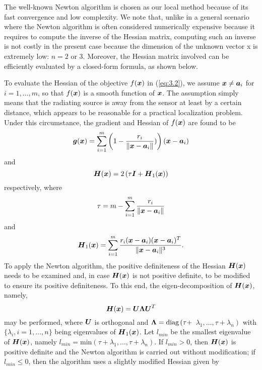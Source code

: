 The well-known Newton algorithm \cite{AntonLu} is chosen as our local method because of its fast convergence and low complexity. We note that, unlike in a general scenario where the Newton algorithm is often considered numerically expensive because it requires to compute the inverse of the Hessian matrix, computing such an inverse is not costly in the present case because the dimension of the unknown vector x is extremely low: $n = 2$ or 3. Moreover, the Hessian matrix involved can be efficiently evaluated by a closed-form formula, as shown below.

To evaluate the Hessian of the objective $f(\mbox{\boldmath$x$})$ in (\ref{eq:3.2}), we assume $\mbox{\boldmath$x$}\neq\mbox{\boldmath$a$}_i$  for $i = 1, \ldots, m$, so that $f(\mbox{\boldmath$x$})$  is a smooth function of $\mbox{\boldmath$x$}$. The assumption simply means that the radiating source is away from the sensor at least by a certain distance, which appears to be reasonable for a practical localization problem. Under this circumstance, the gradient and Hessian of $f(\mbox{\boldmath$x$})$ are found to be
\begin{equation}
\nonumber
\mbox{\boldmath$g$}(\mbox{\boldmath$x$})=\sum_{i=1}^m\left(1-\frac{r_i}{\|\mbox{\boldmath$x$}-\mbox{\boldmath$a$}_i\|})\right)\left(\mbox{\boldmath$x$}-\mbox{\boldmath$a$}_i\right)
\end{equation}
and
\begin{equation}
\nonumber
\mbox{\boldmath$H$}(\mbox{\boldmath$x$})=2\left(\tau\mbox{\boldmath$I$}+\mbox{\boldmath$H$}_1(\mbox{\boldmath$x$})\right)
\end{equation}
respectively, where
\begin{equation}
\nonumber
\tau=m-\sum_{i=1}^m \frac{r_i}{\|\mbox{\boldmath$x$}-\mbox{\boldmath$a$}_i\|}
\end{equation}
and
\begin{equation}
\nonumber
\mbox{\boldmath$H$}_1(\mbox{\boldmath$x$})=\sum_{i=1}^m \frac{r_i(\mbox{\boldmath$x$}-\mbox{\boldmath$a$}_i)(\mbox{\boldmath$x$}-\mbox{\boldmath$a$}_i)^T}{\|\mbox{\boldmath$x$}-\mbox{\boldmath$a$}_i\|^3}.
\end{equation}
To apply the Newton algorithm, the positive definiteness of the Hessian $\mbox{\boldmath$H$}(\mbox{\boldmath$x$})$ needs to be examined and, in case $\mbox{\boldmath$H$}(\mbox{\boldmath$x$})$ is not positive definite, to be modified to ensure its positive definiteness. To this end, the eigen-decomposition of $\mbox{\boldmath$H$}(\mbox{\boldmath$x$})$, namely,
\begin{equation}
\nonumber
\mbox{\boldmath$H$}(\mbox{\boldmath$x$})=\mbox{\boldmath$U$}\mbox{\boldmath{$\Lambda$}}\mbox{\boldmath$U$}^T
\end{equation}
may be performed, where $\mbox{\boldmath$U$}$ is orthogonal and $\mbox{\boldmath{$\Lambda$}}=\mbox{diag}\left(\tau+\right.$ $\left.\lambda_1,\ldots, \tau+\lambda_n\right)$  with $\{\lambda_i,i=1,\ldots,n\}$ being eigenvalues of $\mbox{\boldmath$H$}_1(\mbox{\boldmath$x$})$. Let $l_{min}$  be the smallest eigenvalue of $\mbox{\boldmath$H$}(\mbox{\boldmath$x$})$, namely $l_{min}=\mbox{min}\left(\tau+\lambda_1,\ldots, \tau+\lambda_n\right)$.  If  $l_{min}>0$, then $\mbox{\boldmath$H$}(\mbox{\boldmath$x$})$  is positive definite and the Newton algorithm is carried out without modification; if $l_{min}\leq0$, then the algorithm uses a slightly modified Hessian given by
